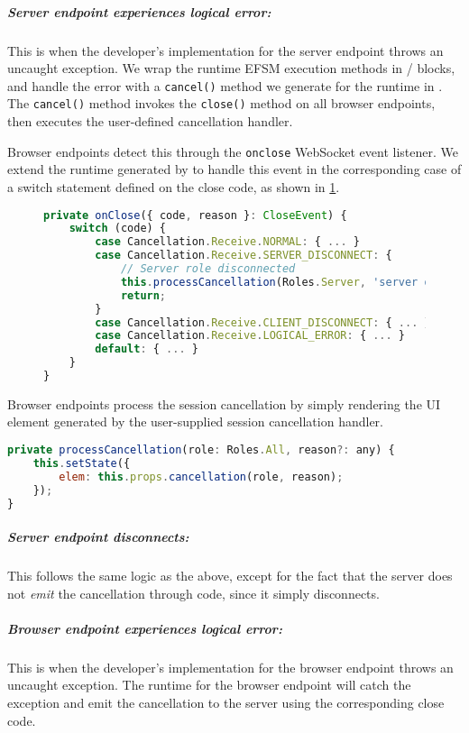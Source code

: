 \subparagraph{Server endpoint experiences logical error:}
This is when the developer's implementation for the server
endpoint throws an uncaught exception. 
We wrap the runtime EFSM execution methods in
/
blocks, and handle the error with a \texttt{cancel()}
method we generate for the runtime in .
The \texttt{cancel()} method invokes
the \texttt{close()} method on all browser endpoints,
then executes the user-defined cancellation handler.

Browser endpoints detect this through the \texttt{onclose}
WebSocket event listener. We extend the runtime
generated by  to handle this event
in the corresponding case of a switch statement
defined on the close code, 
as shown in \cref{lst:canceloncloseclient}.

\begin{figure}[!h]
\begin{lstlisting}[language=javascript,tabsize=2]
private onClose({ code, reason }: CloseEvent) {
	switch (code) {
		case Cancellation.Receive.NORMAL: { ... }
		case Cancellation.Receive.SERVER_DISCONNECT: {
			// Server role disconnected
			this.processCancellation(Roles.Server, 'server disconnected')
			return;
		}
		case Cancellation.Receive.CLIENT_DISCONNECT: { ... }
		case Cancellation.Receive.LOGICAL_ERROR: { ... }
		default: { ... }
	}
}
\end{lstlisting}
\label{lst:canceloncloseclient}
\end{figure}

Browser endpoints process the session cancellation
by simply rendering the UI element generated
by the user-supplied session cancellation handler.

\begin{lstlisting}[language=javascript,tabsize=2]
private processCancellation(role: Roles.All, reason?: any) {
	this.setState({
		elem: this.props.cancellation(role, reason);
	});
}
\end{lstlisting}

\subparagraph{Server endpoint disconnects:}
This follows the same logic as the above,
except for the fact that the server does not
\textit{emit} the cancellation through code, since
it simply disconnects.

\subparagraph{Browser endpoint experiences logical error:}
This is when the developer's implementation for the browser
endpoint throws an uncaught exception. 
The runtime for the browser endpoint will catch
the exception and emit the cancellation to the server
using the corresponding close code.

